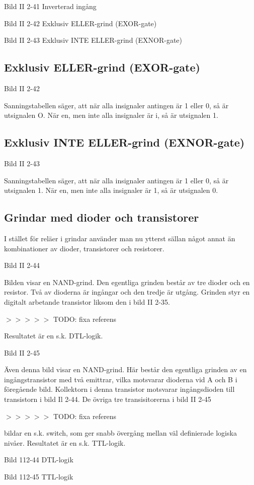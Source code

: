 Bild II 2-41 Inverterad ingång

Bild II 2-42 Exklusiv ELLER-grind (EXOR-gate)

Bild II 2-43 Exklusiv INTE ELLER-grind (EXNOR-gate)


\subsection{Exklusiv ELLER-grind (EXOR-gate)}

Bild II 2-42

Sanningstabellen säger, att när alla insignaler antingen är 1 eller 0, så är
utsignalen O. När en, men inte alla insignaler är i, så är utsignalen 1.

\subsection{Exklusiv INTE ELLER-grind (EXNOR-gate)}

Bild II 2-43

Sanningstabellen säger, att när alla insignaler antingen är 1 eller 0, så är
utsignalen 1. När en, men inte alla insignaler är 1, så är utsignalen 0.

\subsection{Grindar med dioder och transistorer}

I stället för reläer i grindar använder man nu ytterst sällan något annat än
kombinationer av dioder, transistorer och resistorer.

Bild II 2-44

Bilden visar en NAND-grind. Den egentliga grinden består av tre dioder och en
resistor. Två av dioderna är ingångar och den tredje är utgång. Grinden styr en
digitalt arbetande transistor liksom den i bild II 2-35.

$>>>>>$ TODO: fixa referens

Resultatet är en s.k. DTL-logik.

Bild II 2-45

Även denna bild visar en NAND-grind. Här består den egentliga grinden av en
ingångstransistor med två emittrar, vilka motsvarar dioderna vid A och B i
föregående bild. Kollektorn i denna transistor motsvarar ingångsdioden till
transistorn i bild Il 2-44. De övriga tre transisitorerna i bild II 2-45

$>>>>>$ TODO: fixa referens

bildar en s.k. switch, som ger snabb övergång mellan väl definierade logiska
nivåer. Resultatet är en s.k. TTL-logik.

Bild 112-44 DTL-logik

Bild 112-45 TTL-logik
